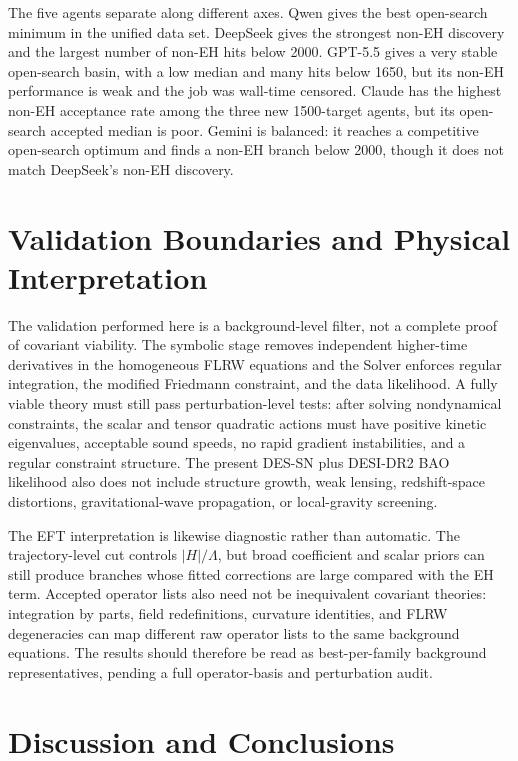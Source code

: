 \documentclass[aps,prd,twocolumn,superscriptaddress,nofootinbib,longbibliography]{revtex4-2}
\begin{document}
The five agents separate along different axes.  Qwen gives the best open-search minimum in the unified data set.  DeepSeek gives the strongest non-EH discovery and the largest number of non-EH hits below 2000.  GPT-5.5 gives a very stable open-search basin, with a low median and many hits below 1650, but its non-EH performance is weak and the job was wall-time censored.  Claude has the highest non-EH acceptance rate among the three new 1500-target agents, but its open-search accepted median is poor.  Gemini is balanced: it reaches a competitive open-search optimum and finds a non-EH branch below 2000, though it does not match DeepSeek's non-EH discovery.

\section{Validation Boundaries and Physical Interpretation}
\label{sec:validation-boundaries}

The validation performed here is a background-level filter, not a complete proof of covariant viability.  The symbolic stage removes independent higher-time derivatives in the homogeneous FLRW equations and the Solver enforces regular integration, the modified Friedmann constraint, and the data likelihood.  A fully viable theory must still pass perturbation-level tests: after solving nondynamical constraints, the scalar and tensor quadratic actions must have positive kinetic eigenvalues, acceptable sound speeds, no rapid gradient instabilities, and a regular constraint structure.  The present DES-SN plus DESI-DR2 BAO likelihood also does not include structure growth, weak lensing, redshift-space distortions, gravitational-wave propagation, or local-gravity screening.

The EFT interpretation is likewise diagnostic rather than automatic.  The trajectory-level cut controls $|H|/\Lambda$, but broad coefficient and scalar priors can still produce branches whose fitted corrections are large compared with the EH term.  Accepted operator lists also need not be inequivalent covariant theories: integration by parts, field redefinitions, curvature identities, and FLRW degeneracies can map different raw operator lists to the same background equations.  The results should therefore be read as best-per-family background representatives, pending a full operator-basis and perturbation audit.

\section{Discussion and Conclusions}
\label{sec:conclusion}
\end{document}
